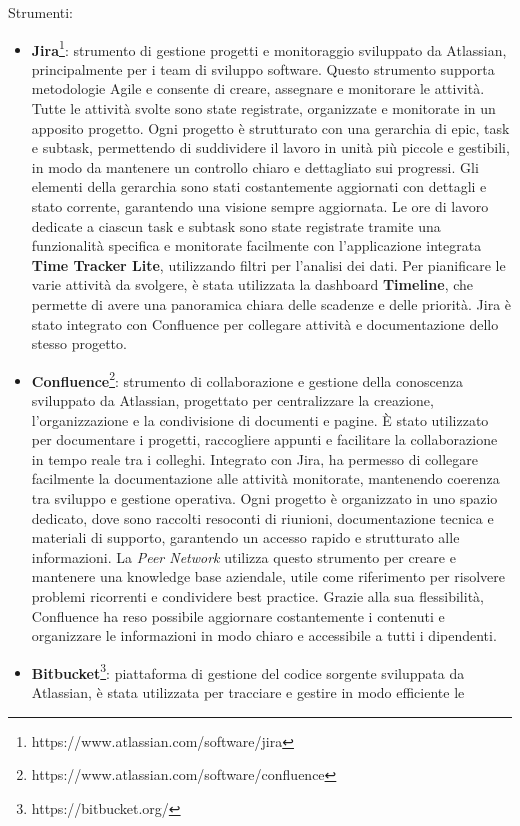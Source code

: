 Strumenti:
\begin{itemize}
    \item \textbf{Jira}\footnote{https://www.atlassian.com/software/jira}: strumento di gestione progetti e monitoraggio sviluppato da Atlassian, principalmente per i team di sviluppo software. Questo strumento
    supporta metodologie Agile e consente di creare, assegnare e monitorare le attività. Tutte le attività svolte sono state registrate, organizzate e monitorate
    in un apposito progetto. Ogni progetto è strutturato con una gerarchia di epic, task e subtask, permettendo di suddividere il lavoro in unità più piccole e
    gestibili, in modo da mantenere un controllo chiaro e dettagliato sui progressi. Gli elementi della gerarchia sono stati costantemente aggiornati con dettagli
    e stato corrente, garantendo una visione sempre aggiornata. Le ore di lavoro dedicate a ciascun task e subtask sono state registrate tramite una funzionalità
    specifica e monitorate facilmente con l’applicazione integrata \textbf{Time Tracker Lite}, utilizzando filtri per l’analisi dei dati. Per pianificare le varie attività
    da svolgere, è stata utilizzata la dashboard \textbf{Timeline}, che permette di avere una panoramica chiara delle scadenze e delle priorità. Jira è stato integrato con
    Confluence per collegare attività e documentazione dello stesso progetto.
    \item \textbf{Confluence}\footnote{https://www.atlassian.com/software/confluence}: strumento di collaborazione e gestione della conoscenza sviluppato da Atlassian, progettato per centralizzare la creazione, l'organizzazione
    e la condivisione di documenti e pagine. È stato utilizzato per documentare i progetti, raccogliere appunti e facilitare la collaborazione in tempo reale tra i colleghi.
    Integrato con Jira, ha permesso di collegare facilmente la documentazione alle attività monitorate, mantenendo coerenza tra sviluppo e gestione operativa. Ogni progetto
    è organizzato in uno spazio dedicato, dove sono raccolti resoconti di riunioni, documentazione tecnica e materiali di supporto, garantendo un accesso rapido e
    strutturato alle informazioni. La \textit{Peer Network} utilizza questo strumento per creare e mantenere una knowledge base aziendale, utile come riferimento per risolvere
    problemi ricorrenti e condividere best practice. Grazie alla sua flessibilità, Confluence ha reso possibile aggiornare costantemente i contenuti e organizzare le
    informazioni in modo chiaro e accessibile a tutti i dipendenti.
    \item \textbf{Bitbucket}\footnote{https://bitbucket.org/}: piattaforma di gestione del codice sorgente sviluppata da Atlassian, è stata utilizzata per tracciare e gestire in modo efficiente le

\end{itemize}
